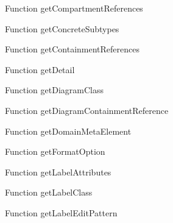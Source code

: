 \begin{minipage}[b]{0.5\textwidth}
\centering
{}
Function getCompartmentReferences
\end{minipage}
\begin{minipage}[b]{0.5\textwidth}
\centering
{}
Function getConcreteSubtypes
\end{minipage}
\begin{minipage}[b]{0.5\textwidth}
\centering
{}
Function getContainmentReferences
\end{minipage}
\begin{minipage}[b]{0.5\textwidth}
\centering
{}
Function getDetail
\end{minipage}
\begin{minipage}[b]{0.5\textwidth}
\centering
{}
Function getDiagramClass
\end{minipage}
\begin{minipage}[b]{0.5\textwidth}
\centering
{}
Function getDiagramContainmentReference
\end{minipage}
\begin{minipage}[b]{0.5\textwidth}
\centering
{}
Function getDomainMetaElement
\end{minipage}
\begin{minipage}[b]{0.5\textwidth}
\centering
{}
Function getFormatOption
\end{minipage}
\begin{minipage}[b]{0.5\textwidth}
\centering
{}
Function getLabelAttributes
\end{minipage}
\begin{minipage}[b]{0.5\textwidth}
\centering
{}
Function getLabelClass
\end{minipage}
\begin{minipage}[b]{0.5\textwidth}
\centering
{}
Function getLabelEditPattern
\end{minipage}
